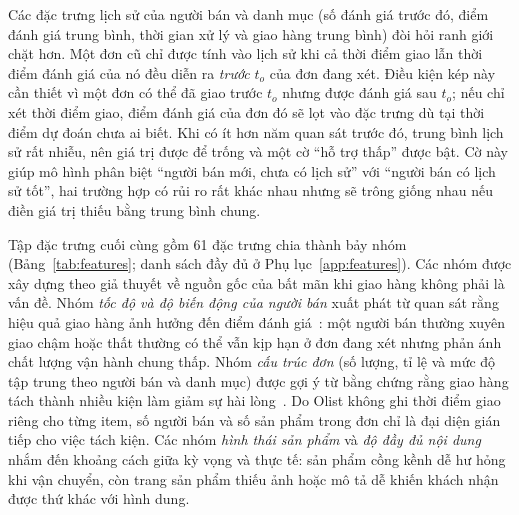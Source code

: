 \documentclass[12pt,a4paper]{report}
\begin{document}
Các đặc trưng lịch sử của người bán và danh mục (số đánh giá trước đó, điểm đánh giá trung bình, thời gian xử lý và giao hàng trung bình) đòi hỏi ranh giới chặt hơn. Một đơn cũ chỉ được tính vào lịch sử khi cả thời điểm giao lẫn thời điểm đánh giá của nó đều diễn ra \emph{trước} $t_o$ của đơn đang xét. Điều kiện kép này cần thiết vì một đơn có thể đã giao trước $t_o$ nhưng được đánh giá sau $t_o$; nếu chỉ xét thời điểm giao, điểm đánh giá của đơn đó sẽ lọt vào đặc trưng dù tại thời điểm dự đoán chưa ai biết. Khi có ít hơn năm quan sát trước đó, trung bình lịch sử rất nhiễu, nên giá trị được để trống và một cờ ``hỗ trợ thấp'' được bật. Cờ này giúp mô hình phân biệt ``người bán mới, chưa có lịch sử'' với ``người bán có lịch sử tốt'', hai trường hợp có rủi ro rất khác nhau nhưng sẽ trông giống nhau nếu điền giá trị thiếu bằng trung bình chung.

Tập đặc trưng cuối cùng gồm 61 đặc trưng chia thành bảy nhóm (Bảng~\ref{tab:features}; danh sách đầy đủ ở Phụ lục~\ref{app:features}). Các nhóm được xây dựng theo giả thuyết về nguồn gốc của bất mãn khi giao hàng không phải là vấn đề. Nhóm \emph{tốc độ và độ biến động của người bán} xuất phát từ quan sát rằng hiệu quả giao hàng ảnh hưởng đến điểm đánh giá~\cite{ravula2023,deshpande2023}: một người bán thường xuyên giao chậm hoặc thất thường có thể vẫn kịp hạn ở đơn đang xét nhưng phản ánh chất lượng vận hành chung thấp. Nhóm \emph{cấu trúc đơn} (số lượng, tỉ lệ và mức độ tập trung theo người bán và danh mục) được gợi ý từ bằng chứng rằng giao hàng tách thành nhiều kiện làm giảm sự hài lòng~\cite{brylla2022}. Do Olist không ghi thời điểm giao riêng cho từng item, số người bán và số sản phẩm trong đơn chỉ là đại diện gián tiếp cho việc tách kiện. Các nhóm \emph{hình thái sản phẩm} và \emph{độ đầy đủ nội dung} nhắm đến khoảng cách giữa kỳ vọng và thực tế: sản phẩm cồng kềnh dễ hư hỏng khi vận chuyển, còn trang sản phẩm thiếu ảnh hoặc mô tả dễ khiến khách nhận được thứ khác với hình dung.
\end{document}
